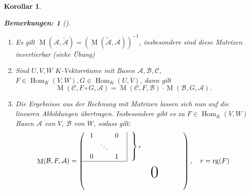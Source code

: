 \documentclass{report}
\newcommand{\baseb}{\mathcal{B}}
\newcommand{\basea}{\mathcal{A}}
\DeclareMathOperator{\Hom}{Hom}
\DeclareMathOperator{\rg}{rg}
\DeclareMathOperator{\M}{M}
\theoremstyle{customrem}
\newtheorem*{bemerkung2}{Bemerkungen\textnormal:}
\newenvironment{bemerkungen}[1][]{\begin{bemerkung2}[#1]\leavevmode}{\end{bemerkung2}}
\theoremstyle{customdef}
\newtheorem{korrolar}[definition]{Korollar}
\begin{document}
\begin{korrolar}
		
		\begin{bemerkungen}
			\begin{enumerate}[label = \roman*)]
				\item Es gilt $\M(\basea, \widetilde{\basea})=(\M(\widetilde{\basea}, \basea))^{-1}$, insbesondere sind diese Matrizen invertierbar (siehe Übung)
				\item Sind $U, V, W$ $K$-Vektorräume mit Basen $\basea, \baseb, \mathcal{C}$, $F\in\Hom_K(V, W), G\in\Hom_K(U, V)$, dann gilt $$\M(\mathcal{C}, F\circ G, \basea) = \M(\mathcal{C}, F, \baseb)\cdot \M(\baseb, G, \basea).$$
				\item Die Ergebnisse aus der Rechnung mit Matrizen lassen sich nun auf die linearen Abbildungen übertragen. Insbesondere gibt es zu $F\in\Hom_K(V, W)$ Basen $\basea$ von $V$, $\baseb$ von $W$, sodass gilt:
				$$\M(\baseb, F, \basea) = \left(
				\begin{matrix}
				
				
				\multicolumn{1}{c|}{
				
				\begin{matrix}
					1 & 	  & 0\\
					  &\ddots &\\
					0 &		  & 1\\
				\end{matrix}}
				&
				\left.\vphantom{
				\begin{matrix}
					1 & 	  & 0\\
					  &\ddots &\\
					0 &		  & 1\\
				\end{matrix}}\right\}\text{\scriptsize $r$}\hspace{2cm}
				\\\cline{1-1}
				\hspace{2cm}
				&
				\vphantom{
					\begin{matrix}
					1 & 	  & 0\\
					&\ddots &\\
					0 &		  & 1\\
					\end{matrix}}\kern-2\nulldelimiterspace
				\mbox{\Huge 0}
				\end{matrix}
				\hspace{.15cm}
				\right), \quad r=\rg(F)$$
			\end{enumerate}
		\end{bemerkungen}
	\end{korrolar}
	
\end{document}
